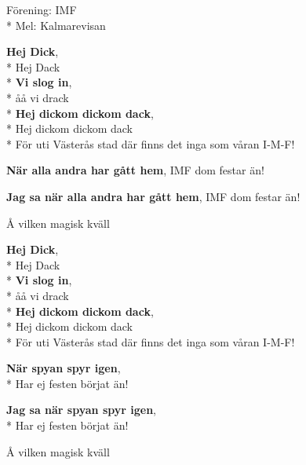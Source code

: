 \begin{SongText}
    \begin{SongInfo}
        Förening: IMF\\*%
        Mel: Kalmarevisan
    \end{SongInfo}
    \begin{SongVerse}
        \textbf{Hej Dick}, \\*%
        Hej Dack\\*%
        \textbf{Vi slog in}, \\*%
        åå vi drack\\*%
        \textbf{Hej dickom dickom dack}, \\*%
        Hej dickom dickom dack\\*%
        För uti Västerås stad där finns det inga som våran I-M-F!
    \end{SongVerse}
    \begin{SongVerse}
        \textbf{När alla andra har gått hem}, IMF dom festar än!

        \textbf{Jag sa när alla andra har gått hem}, IMF dom festar än!

        Å vilken magisk kväll
    \end{SongVerse}
    \begin{SongVerse}
        \textbf{Hej Dick}, \\*%
        Hej Dack\\*%
        \textbf{Vi slog in}, \\*%
        åå vi drack\\*%
        \textbf{Hej dickom dickom dack}, \\*%
        Hej dickom dickom dack\\*%
        För uti Västerås stad där finns det inga som våran I-M-F!
    \end{SongVerse}
    \begin{SongVerse}
        \textbf{När spyan spyr igen}, \\*%
        Har ej festen börjat än!

        \textbf{Jag sa när spyan spyr igen}, \\*%
        Har ej festen börjat än!

        Å vilken magisk kväll

    \end{SongVerse}
\end{SongText}
